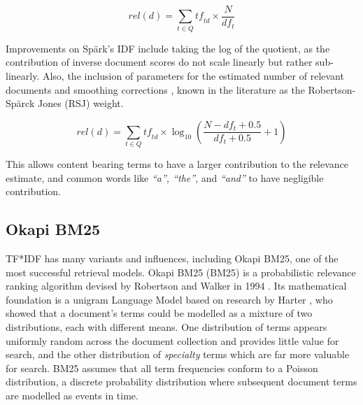 \begin{equation} \label{tfidf}
    rel(d) = \sum_{t \in Q} \mathit{tf}_{td} \times \frac{N}{df_{t}}
\end{equation}

Improvements on Sp{\"a}rk's IDF include taking the log of the quotient, as the contribution of inverse document scores do not scale linearly but rather sub-linearly. Also, the inclusion of parameters for the estimated number of relevant documents and smoothing corrections \cite{robertson1976relevance, robertson1997relevance}, known in the literature as the Robertson-Sp{\"a}rck Jones (RSJ) weight.

\begin{equation} \label{tfidfrsj}
    rel(d) = \sum_{t \in Q} \mathit{tf}_{td} \times \log_{10}\left(\frac{N - df_{t} + 0.5}{df_{t} + 0.5} + 1\right)
\end{equation}

This allows content bearing terms to have a larger contribution to the relevance estimate, and common words like \textit{``a'', ``the''}, and \textit{``and''} to have negligible contribution.
















\subsection{Okapi BM25}
TF*IDF has many variants and influences, including Okapi BM25, one of the most successful retrieval models. Okapi BM25 (BM25) is a probabilistic relevance ranking algorithm devised by Robertson and Walker in 1994 \cite{robertson1995okapi}. Its mathematical foundation is a unigram Language Model based on research by Harter \cite{harter1975probabilistic}, who showed that a document's terms could be modelled as a mixture of two distributions, each with different means. One distribution of terms appears uniformly random across the document collection and provides little value for search, and the other distribution of \textit{specialty} terms which are far more valuable for search. BM25 assumes that all term frequencies conform to a Poisson distribution, a discrete probability distribution where subsequent document terms are modelled as events in time.

